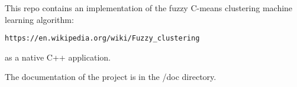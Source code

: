 This repo contains an implementation of the fuzzy C-\/means clustering machine learning algorithm\+:

{\tt https\+://en.\+wikipedia.\+org/wiki/\+Fuzzy\+\_\+clustering}

as a native C++ application.

The documentation of the project is in the /doc directory. 